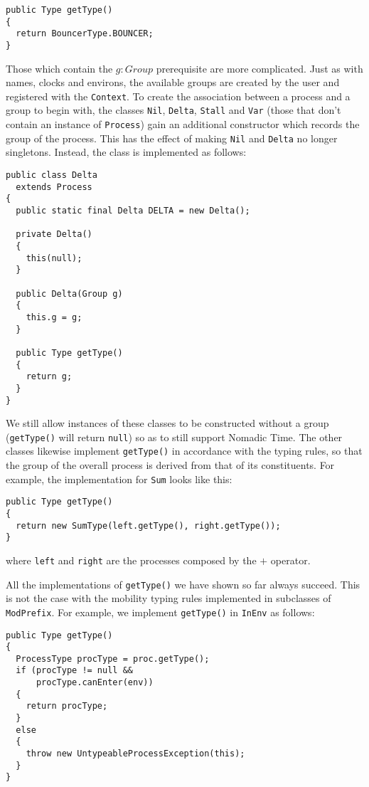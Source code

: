 \begin{verbatim}
public Type getType()
{
  return BouncerType.BOUNCER;
}
\end{verbatim}

Those which contain the $g : Group$ prerequisite are more complicated.
Just as with names, clocks and environs, the available groups are
created by the user and registered with the \texttt{Context}.  To
create the association between a process and a group to begin with,
the classes \texttt{Nil}, \texttt{Delta}, \texttt{Stall} and
\texttt{Var} (those that don't contain an instance of
\texttt{Process}) gain an additional constructor which records the
group of the process.  This has the effect of making \texttt{Nil} and
\texttt{Delta} no longer singletons.  Instead, the class is
implemented as follows:

\begin{verbatim}
public class Delta
  extends Process
{
  public static final Delta DELTA = new Delta();

  private Delta() 
  { 
    this(null); 
  }
  
  public Delta(Group g) 
  { 
    this.g = g; 
  }

  public Type getType()
  {
    return g;
  }
}
\end{verbatim}

We still allow instances of these classes to be constructed without a
group (\texttt{getType()} will return \texttt{null}) so as to still
support Nomadic Time.  The other classes likewise implement
\texttt{getType()} in accordance with the typing rules, so that the
group of the overall process is derived from that of its constituents.
For example, the implementation for \texttt{Sum} looks like this:

\begin{verbatim}
public Type getType()
{
  return new SumType(left.getType(), right.getType());
}
\end{verbatim}

\noindent where \texttt{left} and \texttt{right} are the processes
composed by the $+$ operator.

All the implementations of \texttt{getType()} we have shown so far
always succeed.  This is not the case with the mobility typing rules
implemented in subclasses of \texttt{ModPrefix}.  For example, we
implement \texttt{getType()} in \texttt{InEnv} as follows:

\begin{verbatim}
public Type getType()
{
  ProcessType procType = proc.getType();  
  if (procType != null &&
      procType.canEnter(env))
  {
    return procType;
  }
  else
  {
    throw new UntypeableProcessException(this);
  }
}
 
\end{verbatim}


